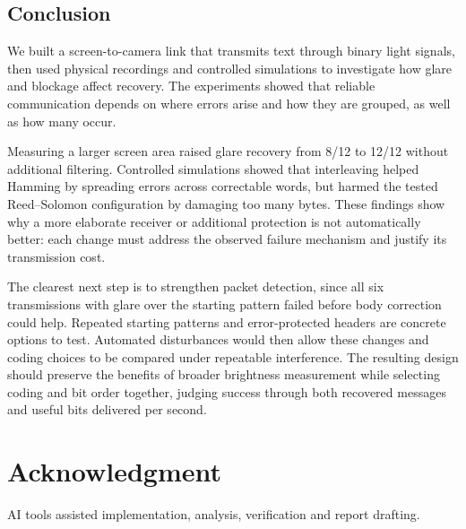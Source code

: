 \documentclass[conference,a4paper]{IEEEtran}
\begin{document}
\subsection{Conclusion}
We built a screen-to-camera link that transmits text through binary light
signals, then used physical recordings and controlled simulations to
investigate how glare and blockage affect recovery. The experiments showed
that reliable communication depends on where errors arise and how they
are grouped, as well as how many occur.

Measuring a larger screen area raised glare recovery from 8/12 to 12/12
without additional filtering. Controlled simulations showed that
interleaving helped Hamming by spreading errors across correctable words,
but harmed the tested Reed--Solomon configuration by damaging too many bytes.
These findings show why a more elaborate receiver or additional protection
is not automatically better: each change must address the observed failure
mechanism and justify its transmission cost.

The clearest next step is to strengthen packet detection, since all six
transmissions with glare over the starting pattern failed before body
correction could help. Repeated starting patterns and error-protected
headers are concrete options to test. Automated disturbances would then
allow these changes and coding choices to be compared under repeatable
interference. The resulting design should preserve the benefits of broader
brightness measurement while selecting coding and bit order together,
judging success through both recovered messages and useful bits delivered
per second.

\section*{Acknowledgment}
AI tools assisted implementation, analysis, verification and report drafting.
\end{document}
